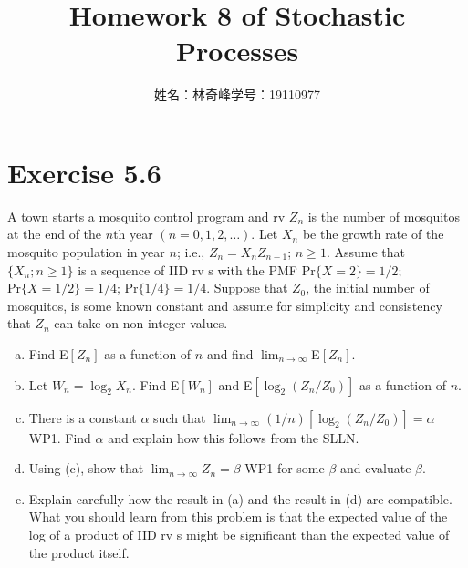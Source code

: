 \documentclass{article}
\begin{document}
    \title{Homework 8 of Stochastic Processes}
    \author{姓名：林奇峰\qquad 学号：19110977}
    \maketitle

    \section{Exercise 5.6}
    A town starts a mosquito control program and rv $Z_n$ is the number of mosquitos at the end of the $n$th year $(n=0,1,2,\dots)$. Let $X_n$ be the growth rate of the mosquito population in year $n$; i.e., $Z_n=X_nZ_{n-1}$; $n\geq 1$. Assume that $\{X_n;n\geq 1\}$ is a sequence of IID rv s with the PMF $\text{Pr}\{X=2\}=1/2$; $\text{Pr}\{X=1/2\}=1/4$; $\text{Pr}\{1/4\}=1/4$. Suppose that $Z_0$, the initial number of mosquitos, is some known constant and assume for simplicity and consistency that $Z_n$ can take on non-integer values.
    \begin{enumerate}[(a)]
        \item Find E$[Z_n]$ as a function of $n$ and find $\lim_{n\rightarrow\infty}$E$[Z_n]$.
        \item Let $W_n=\log_2X_n$. Find E$[W_n]$ and E$[\log_2(Z_n/Z_0)]$ as a function of $n$.
        \item There is a constant $\alpha$ such that $\lim_{n\rightarrow\infty}(1/n)[\log_2(Z_n/Z_0)]=\alpha$ WP1. Find $\alpha$ and explain how this follows from the SLLN.
        \item Using (c), show that $\lim_{n\rightarrow\infty}Z_n=\beta$ WP1 for some $\beta$ and evaluate $\beta$.
        \item Explain carefully how the result in (a) and the result in (d) are compatible. What you should learn from this problem is that the expected value of the log of a product of IID rv s might be significant than the expected value of the product itself.
    \end{enumerate}
\end{document}
